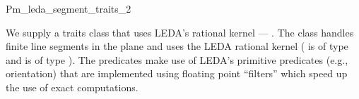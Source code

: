 
\ccRefPageBegin


\renewcommand{\ccRefPageBegin}{\begin{ccAdvanced}}
\renewcommand{\ccRefPageEnd}{\end{ccAdvanced}}

\begin{ccRefClass}{Pm_leda_segment_traits_2}

We supply a traits class that uses LEDA's rational kernel ---
.
The class handles
finite line segments in the plane
and uses the LEDA rational kernel ( is of type 
 and  is of type
). The predicates make use of LEDA's primitive
predicates (e.g., orientation) that are implemented using floating point
``filters'' \cite{fv-sayee-96} which speed up the use of exact computations.


\ccIsModel

\end{ccRefClass} %

\renewcommand{\ccRefPageBegin}{}
\renewcommand{\ccRefPageEnd}{}

\ccRefPageEnd
